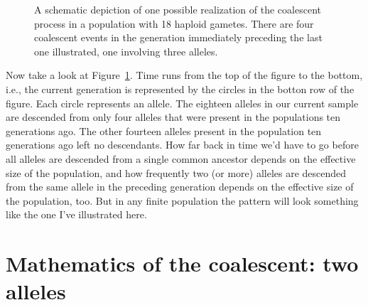 \begin{figure}
\begin{center}
\end{center}
\caption{A schematic depiction of one possible realization of the
  coalescent process in a population with 18 haploid gametes. There
  are four coalescent events in the generation immediately preceding
  the last one illustrated, one involving three alleles.}\label{fig:coalescent}
\end{figure}

Now take a look at Figure~\ref{fig:coalescent}. Time runs from the top
of the figure to the bottom, i.e., the current generation is
represented by the circles in the botton row of the figure. Each
circle represents an allele. The eighteen alleles in our current
sample are descended from only four alleles that were present in the
populations ten generations ago. The other fourteen alleles present in
the population ten generations ago left no descendants. How far back
in time we'd have to go before all alleles are descended from a single
common ancestor depends on the effective size of the population, and
how frequently two (or more) alleles are descended from the same
allele in the preceding generation depends on the effective size of
the population, too. But in any finite population the pattern will
look something like the one I've illustrated here.

\section*{Mathematics of the coalescent: two
  alleles}

